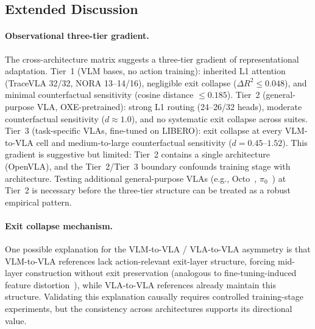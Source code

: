 \subsection{Extended Discussion}
\label{sec:extended_discussion_appendix}

\paragraph{Observational three-tier gradient.}
The cross-architecture matrix suggests a three-tier gradient of representational adaptation.
Tier~1 (VLM bases, no action training): inherited L1 attention (TraceVLA 32/32, NORA 13--14/16), negligible exit collapse ($\Delta R^2 \leq 0.048$), and minimal counterfactual sensitivity (cosine distance $\leq 0.185$).
Tier~2 (general-purpose VLA, OXE-pretrained): strong L1 routing (24--26/32 heads), moderate counterfactual sensitivity ($d \approx 1.0$), and no systematic exit collapse across suites.
Tier~3 (task-specific VLAs, fine-tuned on LIBERO): exit collapse at every VLM-to-VLA cell and medium-to-large counterfactual sensitivity ($d = 0.45$--$1.52$).
This gradient is suggestive but limited: Tier~2 contains a single architecture (OpenVLA), and the Tier~2/Tier~3 boundary confounds training stage with architecture.
Testing additional general-purpose VLAs (e.g., Octo~\cite{ghosh2024_octo}, $\pi_0$~\cite{black2024_pi0}) at Tier~2 is necessary before the three-tier structure can be treated as a robust empirical pattern.

\paragraph{Exit collapse mechanism.}
One possible explanation for the VLM-to-VLA / VLA-to-VLA asymmetry is that VLM-to-VLA references lack action-relevant exit-layer structure, forcing mid-layer construction without exit preservation (analogous to fine-tuning-induced feature distortion~\cite{kumar2022finetuning}), while VLA-to-VLA references already maintain this structure.
Validating this explanation causally requires controlled training-stage experiments, but the consistency across architectures supports its directional value.

